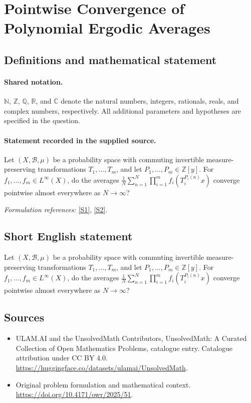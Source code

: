 \documentclass[11pt]{article}
\newcommand{\sref}[2]{\hyperlink{source:#1:#2}{[S#2]}}
\begin{document}
\section{Pointwise Convergence of Polynomial Ergodic Averages}\label{statement}

\subsection{Definitions and mathematical statement}

\paragraph{Shared notation.}$\mathbb N$, $\mathbb Z$, $\mathbb Q$, $\mathbb R$, and $\mathbb C$ denote the natural numbers, integers, rationals, reals, and complex numbers, respectively. All additional parameters and hypotheses are specified in the question.


\paragraph{Statement recorded in the supplied source.}
Let $(X,\mathcal{B},\mu)$ be a probability space with commuting invertible measure-preserving transformations $T_1,\ldots,T_m$, and let $P_1,\ldots,P_m\in\mathbb{Z}[y]$. For $f_1,\ldots,f_m\in L^\infty(X)$, do the averages $\frac{1}{N}\sum_{n=1}^N\prod_{i=1}^m f_i(T_i^{P_i(n)}x)$ converge pointwise almost everywhere as $N\to\infty$?
\par\smallskip\textit{Formulation references:} \sref{statement}{1}, \sref{statement}{2}.
\subsection{Short English statement}
Let $(X,\mathcal{B},\mu)$ be a probability space with commuting invertible measure-preserving transformations $T_1,\ldots,T_m$, and let $P_1,\ldots,P_m\in\mathbb{Z}[y]$. For $f_1,\ldots,f_m\in L^\infty(X)$, do the averages $\frac{1}{N}\sum_{n=1}^N\prod_{i=1}^m f_i(T_i^{P_i(n)}x)$ converge pointwise almost everywhere as $N\to\infty$?
\subsection{Sources}
\begin{itemize}
\item[\hypertarget{source:statement:1}{S1}] ULAM.AI and the UnsolvedMath Contributors, UnsolvedMath: A Curated Collection of Open Mathematics Problems, catalogue entry. Catalogue attribution under CC BY 4.0.
\url{https://huggingface.co/datasets/ulamai/UnsolvedMath}.
\item[\hypertarget{source:statement:2}{S2}] Original problem formulation and mathematical context.
\url{https://doi.org/10.4171/owr/2025/51}.
\end{itemize}
\label{end:statement}
\end{document}
